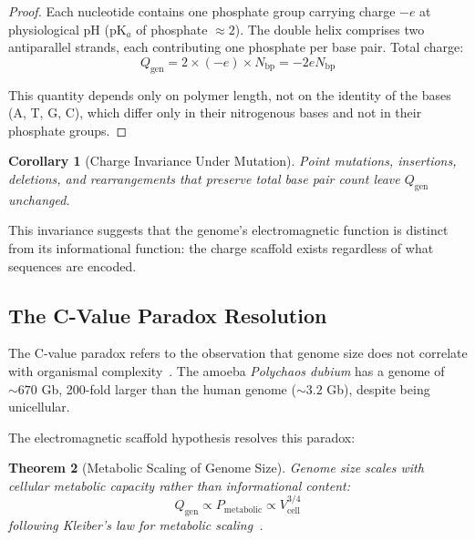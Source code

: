 \documentclass[twocolumn,10pt,aps,prd,superscriptaddress,floatfix,nofootinbib]{revtex4-2}
\newtheorem{theorem}{Theorem}[section]
\newtheorem{corollary}[theorem]{Corollary}
\theoremstyle{remark}
\newcommand{\Qgen}{Q_{\mathrm{gen}}}
\begin{document}
\begin{proof}
Each nucleotide contains one phosphate group carrying charge $-e$ at physiological pH (pK$_a$ of phosphate $\approx 2$). The double helix comprises two antiparallel strands, each contributing one phosphate per base pair. Total charge:
\begin{equation}
\Qgen = 2 \times (-e) \times N_{\mathrm{bp}} = -2e N_{\mathrm{bp}}
\end{equation}

This quantity depends only on polymer length, not on the identity of the bases (A, T, G, C), which differ only in their nitrogenous bases and not in their phosphate groups.
\end{proof}

\begin{corollary}[Charge Invariance Under Mutation]
\label{cor:mutation_invariance}
Point mutations, insertions, deletions, and rearrangements that preserve total base pair count leave $\Qgen$ unchanged.
\end{corollary}

This invariance suggests that the genome's electromagnetic function is distinct from its informational function: the charge scaffold exists regardless of what sequences are encoded.

\subsection{The C-Value Paradox Resolution}

The C-value paradox refers to the observation that genome size does not correlate with organismal complexity~\cite{Gregory2005}. The amoeba \textit{Polychaos dubium} has a genome of $\sim 670$ Gb, 200-fold larger than the human genome ($\sim 3.2$ Gb), despite being unicellular.

The electromagnetic scaffold hypothesis resolves this paradox:

\begin{theorem}[Metabolic Scaling of Genome Size]
\label{thm:c_value}
Genome size scales with cellular metabolic capacity rather than informational content:
\begin{equation}
\Qgen \propto P_{\mathrm{metabolic}} \propto V_{\mathrm{cell}}^{3/4}
\label{eq:kleiber_genome}
\end{equation}
following Kleiber's law for metabolic scaling~\cite{Kleiber1932}.
\end{theorem}
\end{document}

